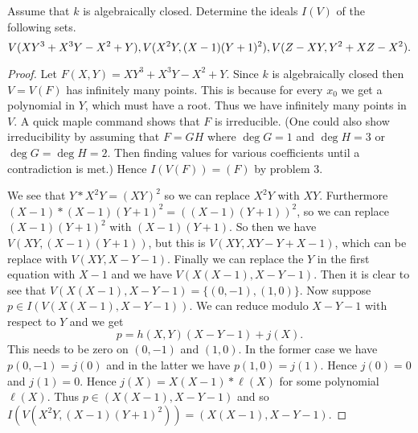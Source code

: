 \documentclass{article}
\begin{document}
\begin{problem}
  Assume that $k$ is algebraically closed. Determine the ideals $I(V)$ of
  the following sets.
  \[V(XY^3+X^3Y-X^2+Y),V(X^2Y,(X-1)(Y+1)^2),\\
  V(Z-XY,Y^2+XZ-X^2).\]
  \begin{proof}
    Let $F(X,Y)=XY^3+X^3Y-X^2+Y$.
    Since $k$ is algebraically closed then $V=V(F)$ has infinitely
    many points. This is because for every $x_0$ we get a polynomial in $Y$,
    which must have a root. Thus we have infinitely many points in $V$. A quick
    maple command shows that $F$ is irreducible. (One could also show
    irreducibility by assuming that $F=GH$ where $\deg G=1$ and $\deg H=3$ or
    $\deg G=\deg H=2$. Then finding values for various coefficients until a
    contradiction is met.)
    Hence $I(V(F))=(F)$ by problem
    3.

    We see that $Y*X^2Y=(XY)^2$ so we can replace $X^2Y$ with $XY$. Furthermore
    $(X-1)*(X-1)(Y+1)^2=( (X-1)(Y+1))^2$, so we can replace $(X-1)(Y+1)^2$ with
    $(X-1)(Y+1)$. So then we have $V(XY,(X-1)(Y+1))$, but this is
    $V(XY,XY-Y+X-1)$, which can be replace with $V(XY,X-Y-1)$. Finally we can
    replace the $Y$ in the first equation with $X-1$ and we have
    $V(X(X-1),X-Y-1)$. Then it is clear
    to see that $V(X(X-1),X-Y-1)=\{(0,-1),(1,0)\}$. Now suppose $p\in
    I(V(X(X-1),X-Y-1))$. We can reduce modulo $X-Y-1$ with respect to $Y$ and we get
    \[p=h(X,Y)(X-Y-1)+j(X).\]
    This needs to be zero on $(0,-1)$ and $(1,0)$. In the former case we have
    $p(0,-1)=j(0)$ and in the latter we have $p(1,0)=j(1)$. Hence $j(0)=0$ and
    $j(1)=0$. Hence $j(X)=X(X-1)*\ell(X)$ for some polynomial $\ell(X)$. Thus
    $p\in(X(X-1),X-Y-1)$ and so $I(V(X^2Y,(X-1)(Y+1)^2))=(X(X-1),X-Y-1)$.
  \end{proof}
\end{problem}
\end{document}
